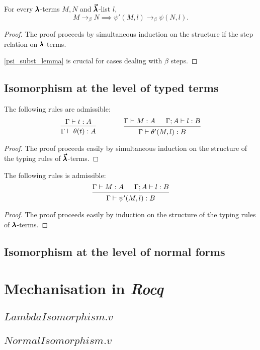 \begin{theorem}
  \label{theorem10}
  For every $\pmb{\lambda}$-terms $M, N$ and $\pmb{\vec \lambda}$-list $l$,
  \[ M \to_{\beta} N \implies \psi'(M, l) \to_{\beta} \psi(N, l). \]
\end{theorem}
\begin{proof}
  The proof proceeds by simultaneous induction on the structure if the step relation on $\pmb{\lambda}$-terms.

  \cref{psi_subst_lemma} is crucial for cases dealing with $\beta$ steps.
\end{proof}

\subsection{Isomorphism at the level of typed terms}

\begin{theorem}
  \label{theorem11}
  The following rules are admissible:
  \[ \begin{prooftree}
      \hypo{ \Gamma \vdash t : A }
      \infer1{ \Gamma \vdash \theta(t) : A } 
    \end{prooftree}
    \qquad \qquad
    \begin{prooftree}
      \hypo{ \Gamma \vdash M : A }
      \hypo{ \Gamma ; A \vdash l : B }
      \infer2{ \Gamma \vdash \theta'(M, l) : B }.
    \end{prooftree} \]
\end{theorem}
\begin{proof}
  The proof proceeds easily by simultaneous induction on the structure of the typing rules of $\pmb{\vec \lambda}$-terms.
\end{proof}

\begin{theorem}
  \label{theorem12}
  The following rules is admissible:
  \[ \begin{prooftree}
      \hypo{ \Gamma \vdash M : A }
      \hypo{ \Gamma ; A \vdash l : B }
      \infer2{ \Gamma \vdash \psi'(M, l) : B }.
    \end{prooftree} \]
\end{theorem}
\begin{proof}
  The proof proceeds easily by induction on the structure of the typing rules of $\pmb{\lambda}$-terms.
\end{proof}

\subsection{Isomorphism at the level of normal forms}



\section{Mechanisation in \textit{Rocq}}

\subsection{\lst$LambdaIsomorphism.v$}
\subsection{\lst$NormalIsomorphism.v$}



